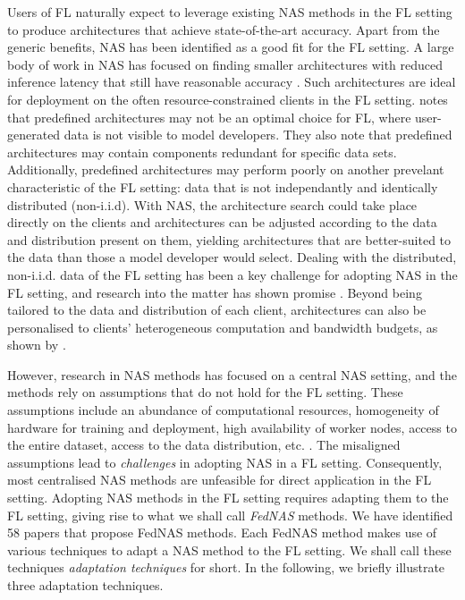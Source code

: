 Users of FL naturally expect to leverage existing NAS methods in the FL setting to produce architectures that achieve state-of-the-art accuracy. Apart from the generic benefits, NAS has been identified as a good fit for the FL setting. A large body of work in NAS has focused on finding smaller architectures with reduced inference latency that still have reasonable accuracy \cite{nas_1000_papers_2023}. Such architectures are ideal for deployment on the often resource-constrained clients in the FL setting. \cite{fl_advances_and_open_problems_2021} notes that predefined architectures may not be an optimal choice for FL, where user-generated data is not visible to model developers. They also note that predefined architectures may contain components redundant for specific data sets. Additionally, predefined architectures may perform poorly on another prevelant characteristic of the FL setting: data that is not independantly and identically distributed (non-i.i.d). With NAS, the architecture search could take place directly on the clients and architectures can be adjusted according to the data and distribution present on them, yielding architectures that are better-suited to the data than those a model developer would select. Dealing with the distributed, non-i.i.d. data of the FL setting has been a key challenge for adopting NAS in the FL setting, and research into the matter has shown promise \cite{fednas_2021} \cite{rl_fednas_2021} \cite{fedoras_2022} \cite{finch_2024} \cite{peaches_2024}. Beyond being tailored to the data and distribution of each client, architectures can also be personalised to clients' heterogeneous computation and bandwidth budgets, as shown by \cite{superfednas_2024} \cite{fedoras_2022} \cite{perfedrlnas_2024} \cite{decnas_2022}.

However, research in NAS methods has focused on a central NAS setting, and the methods rely on assumptions that do not hold for the FL setting. These assumptions include an abundance of computational resources, homogeneity of hardware for training and deployment, high availability of worker nodes, access to the entire dataset, access to the data distribution, etc. \cite{fl_advances_and_open_problems_2021}. The misaligned assumptions lead to \textit{challenges} in adopting NAS in a FL setting. Consequently, most centralised NAS methods are unfeasible for direct application in the FL setting. Adopting NAS methods in the FL setting requires adapting them to the FL setting, giving rise to what we shall call \textit{FedNAS} methods. We have identified 58 papers that propose FedNAS methods. Each FedNAS method makes use of various techniques to adapt a NAS method to the FL setting. We shall call these techniques \textit{adaptation techniques} for short. In the following, we briefly illustrate three adaptation techniques. 

